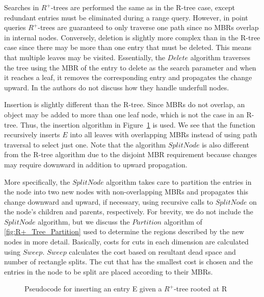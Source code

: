Searches in $R^{+}$-trees are performed the same as in the R-tree case, except
redundant entries must be eliminated during a range query. However, in point queries
$R^{+}$-trees are guaranteed to only traverse one path since no MBRs overlap in 
internal nodes. Conversely, deletion is slightly more complex than in the R-tree case
since there may be more than one entry that must be deleted. This means that multiple 
leaves may be visited. Essentially, the $Delete$ algorithm traverses the tree using
the MBR of the entry to delete as the search parameter and when it reaches a leaf, it 
removes the corresponding entry and propagates the change upward. In 
\cite{sellisroussopoulosfaloutsos87} the authors do not discuss how they handle underfull nodes.


Insertion is slightly different than the R-tree. Since MBRs do not overlap, an
object may be added to more than one leaf node, which is not the case in an R-tree. 
Thus, the insertion algorithm in Figure~\ref{fig:R+_Tree_Insert} is used. We see that
the function recursively inserts $E$ into all leaves with overlapping MBRs instead of 
using path traversal to select just one. Note that the algorithm $SplitNode$ is 
also different from the R-tree algorithm due to the disjoint MBR requirement because
changes may require downward in addition to upward propagation. 

More specifically, the $SplitNode$ algorithm takes care to partition the entries in 
the node into two new nodes with non-overlapping MBRs and propagates this change 
downward and upward, if necessary, using recursive calls to $SplitNode$ on the node's
children and parents, respectively. For brevity, we do not include the $SplitNode$ 
algorithm, but we discuss the $Partition$ algorithm of \ref{fig:R+_Tree_Partition} 
used to determine the regions described by the new nodes in more detail. Basically, 
costs for cuts in each dimension are calculated using $Sweep$. $Sweep$ calculates the
cost based on resultant dead space and number of rectangle splits. The cut that has 
the smallest cost is chosen and the entries in the node to be split are placed 
according to their MBRs. 

\begin{figure}
\begin{algorithmic}
					\State {}
				\EndIf
			\EndFor
		\Else
				\State {}
			\Else
			\EndIf
		\EndIf
	\EndFunction
\end{algorithmic}
\caption{Pseudocode for inserting an entry E given a $R^{+}$-tree rooted at R}
\label{fig:R+_Tree_Insert}
\end{figure}

